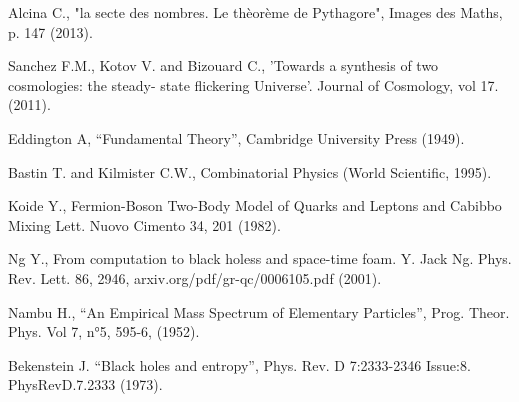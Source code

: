 \documentclass[a4paper,9pt]{article}
\begin{document}
\begin{thebibliography}{99}

 Alcina C., "la secte des nombres. Le thèorème de Pythagore", Images des Maths, p. 147 (2013).


 Sanchez F.M., Kotov V. and Bizouard C., 'Towards a synthesis of two cosmologies: the steady- state flickering Universe'. Journal of Cosmology, vol 17. (2011).

 Eddington A, ``Fundamental Theory'', Cambridge University Press (1949).





 Bastin T. and Kilmister C.W., Combinatorial Physics (World Scientific, 1995).

 Koide Y., Fermion-Boson Two-Body Model of Quarks and Leptons and Cabibbo Mixing  Lett. Nuovo Cimento 34, 201 (1982).

 Ng Y., From computation to black holess and space-time foam. Y. Jack Ng. Phys. Rev. Lett. 86, 2946, arxiv.org/pdf/gr-qc/0006105.pdf (2001).

 Nambu H., “An Empirical Mass Spectrum of Elementary Particles”, Prog. Theor. Phys. Vol 7, n°5, 595-6, (1952).








 Bekenstein J. ``Black holes and entropy'', Phys. Rev. D 7:2333-2346 Issue:8. PhysRevD.7.2333 (1973).


\end{thebibliography}
\end{document}
